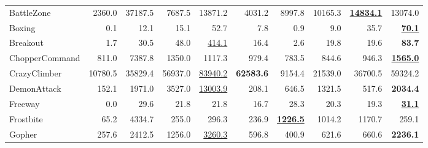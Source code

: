 \begin{table}[t]
\begin{center}
\begin{small}
{\begin{tabular}{lrr rr rrrrr}
BattleZone           &  2360.0    &  37187.5   &  7687.5    &  13871.2               &  4031.2                        &  8997.8                        &  10165.3                      &  \underline{\textbf{14834.1}}  &  13074.0                       \\
Boxing               &  0.1       &  12.1      &  15.1      &  52.7                  &  7.8                           &  0.9                           &  9.0                          &  35.7                          &  \underline{\textbf{70.1}}     \\
Breakout             &  1.7       &  30.5      &  48.0      &  \underline{414.1}     &  16.4                          &  2.6                           &  19.8                         &  19.6                          &  \textbf{83.7}                 \\
ChopperCommand       &  811.0     &  7387.8    &  1350.0    &  1117.3                &  979.4                         &  783.5                         &  844.6                        &  946.3                         &  \underline{\textbf{1565.0}}   \\
CrazyClimber         &  10780.5   &  35829.4   &  56937.0   &  \underline{83940.2}   &  \textbf{62583.6}              &  9154.4                        &  21539.0                      &  36700.5                       &  59324.2                       \\
DemonAttack          &  152.1     &  1971.0    &  3527.0    &  \underline{13003.9}   &  208.1                         &  646.5                         &  1321.5                       &  517.6                         &  \textbf{2034.4}               \\
Freeway              &  0.0       &  29.6      &  21.8      &  21.8                  &  16.7                          &  28.3                          &  20.3                         &  19.3                          &  \underline{\textbf{31.1}}     \\
Frostbite            &  65.2      &  4334.7    &  255.0     &  296.3                 &  236.9                         &  \underline{\textbf{1226.5}}   &  1014.2                       &  1170.7                        &  259.1                         \\
Gopher               &  257.6     &  2412.5    &  1256.0    &  \underline{3260.3}    &  596.8                         &  400.9                         &  621.6                        &  660.6                         &  \textbf{2236.1}               \\

\end{tabular}}
\end{small}
\end{center}
\end{table}
